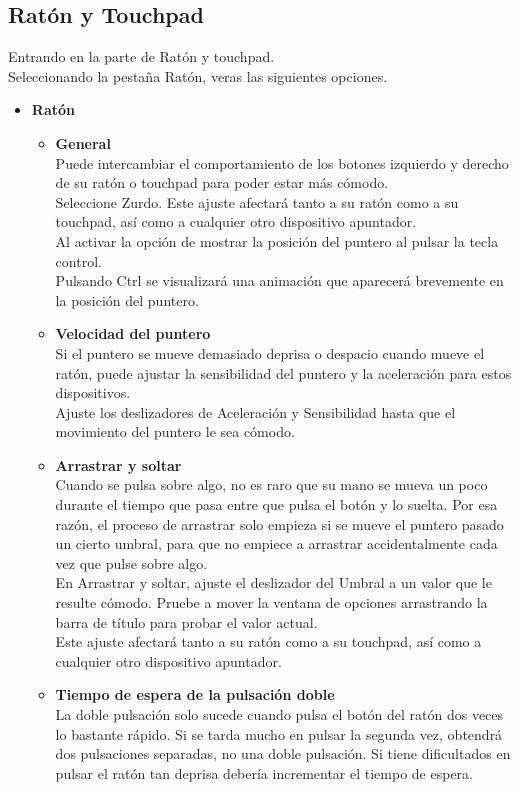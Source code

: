 \subsection{Ratón y Touchpad}
Entrando en la parte de Ratón y touchpad. \\
Seleccionando la pestaña Ratón, veras las siguientes opciones.\\
\begin{itemize}
\item{\large \bf Ratón}\\
\begin{itemize}
\item{\bf General}\\
Puede intercambiar el comportamiento de los botones izquierdo y derecho de su ratón o touchpad para poder estar más cómodo.\\
Seleccione Zurdo.
Este ajuste afectará tanto a su ratón como a su touchpad, así como a cualquier otro dispositivo apuntador.\\

Al activar la opción de mostrar la posición del puntero al pulsar la tecla control.\\
Pulsando Ctrl se visualizará una animación que aparecerá brevemente en la posición del puntero.
\item{\bf Velocidad del puntero}\\
Si el puntero se mueve demasiado deprisa o despacio cuando mueve el ratón, puede ajustar la sensibilidad del puntero y la aceleración para estos dispositivos.\\

Ajuste los deslizadores de Aceleración y Sensibilidad hasta que el movimiento del puntero le sea cómodo.
\item{\bf Arrastrar y soltar}\\
Cuando se pulsa sobre algo, no es raro que su mano se mueva un poco durante el tiempo que pasa entre que pulsa el botón y lo suelta. Por esa razón, el proceso de arrastrar solo empieza si se mueve el puntero pasado un cierto umbral, para que no empiece a arrastrar accidentalmente cada vez que pulse sobre algo.\\

En Arrastrar y soltar, ajuste el deslizador del Umbral a un valor que le resulte cómodo. Pruebe a mover la ventana de opciones arrastrando la barra de título para probar el valor actual.\\

Este ajuste afectará tanto a su ratón como a su touchpad, así como a cualquier otro dispositivo apuntador.
\item{\bf Tiempo de espera de la pulsación doble}\\
La doble pulsación solo sucede cuando pulsa el botón del ratón dos veces lo bastante rápido. Si se tarda mucho en pulsar la segunda vez, obtendrá dos pulsaciones separadas, no una doble pulsación. Si tiene dificultados en pulsar el ratón tan deprisa debería incrementar el tiempo de espera.\\


\end{itemize}
\end{itemize}
